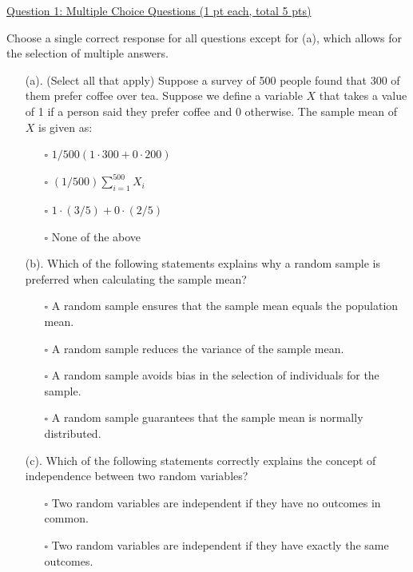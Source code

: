 \documentclass{./../../Latex/tests}
\begin{document}
\thispagestyle{plain}
\vspace{0.5em}


\underline{Question 1: Multiple Choice Questions (1 pt each, total 5 pts)}

Choose a single correct response for all questions except for (a), which allows for the selection of multiple answers.
\begin{enumerate}
\item[(a).] (Select all that apply) Suppose a survey of 500 people found that 300 of them prefer coffee over tea. Suppose we define a variable $X$ that takes a value of 1 if a person said they prefer coffee and 0 otherwise. The sample mean of $X$ is given as:
\begin{enumerate}
\item[$\square$] $1/500(1\cdot 300 + 0\cdot 200) $ 
\item[$\square$] $(1/500)\sum_{i=1}^{500} X_i$
\item[$\square$] $1\cdot (3/5) + 0\cdot (2/5) $ 
\item[$\square$] None of the above \\
\end{enumerate}
\item[(b).] Which of the following statements explains why a random sample is preferred when calculating the sample mean?
\begin{enumerate}
\item[$\square$] A random sample ensures that the sample mean equals the population mean.
\item[$\square$] A random sample reduces the variance of the sample mean.
\item[$\square$] A random sample avoids bias in the selection of individuals for the sample.
\item[$\square$] A random sample guarantees that the sample mean is normally distributed. \\
\end{enumerate}
\item[(c).] Which of the following statements correctly explains the concept of independence between two random variables?
\begin{enumerate}
\item[$\square$] Two random variables are independent if they have no outcomes in common.
\item[$\square$] Two random variables are independent if they have exactly the same outcomes.

\end{enumerate}
\end{enumerate}
\end{document}
